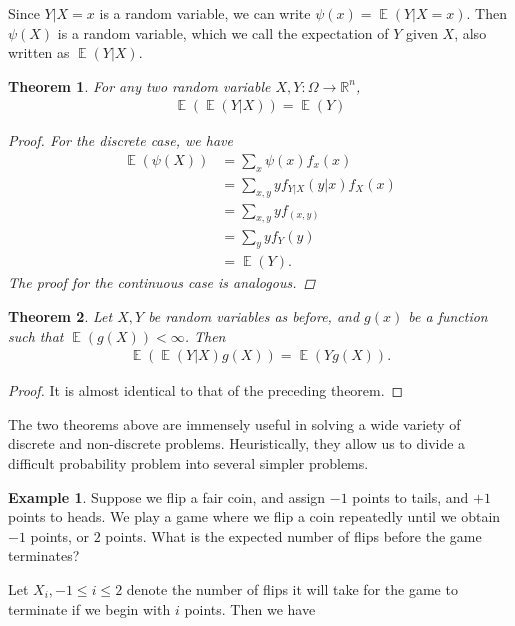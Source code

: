 \documentclass[12pt]{amsbook}
\newcommand{\rr}{\mathbb{R}}
\DeclareMathOperator{\ex}{\mathbb{E}}
\theoremstyle{plain}
\newtheorem{theorem}{Theorem}
\theoremstyle{definition}
\newtheorem*{example}{Example}
\theoremstyle{remark}
\numberwithin{equation}{section}  %
\numberwithin{equation}{section}  %
\begin{document}
	Since $Y|X =x$ is a random variable, we can write $\psi(x) = \ex(Y | X =x)$.
	Then $\psi(X)$ is a random variable, which we call the expectation of $Y$ given
	$X$, also written as $\ex(Y|X)$.
	\begin{theorem}
		For any two random variable $X,Y: \Omega \to \rr^n$,
		\begin{align*}
			\ex(\ex(Y | X)) = \ex(Y)
		\end{align*}
		\begin{proof}
			For the discrete case, we have
			\begin{align*}
				\ex(\psi(X)) 
				& = \sum_{x} \psi(x) f_x(x)
				\\
				& = \sum_{x,y} y f_{Y|X}(y|x) f_X(x)
				\\
				& = \sum_{x,y} y f_{(x,y)}
				\\
				& = \sum_y y f_Y(y)
				\\
				& = \ex(Y).
			\end{align*}
			The proof for the continuous case is analogous. 
		\end{proof}
	\end{theorem}
	\begin{theorem}
		Let $X,Y$ be random variables as before, and $g(x)$ be a function such that
		$\ex(g(X))< \infty$. Then
		\begin{align*}
			\ex(\ex(Y|X)g(X)) = \ex(Yg(X)).
		\end{align*}
	\end{theorem}
	\begin{proof}
		It is almost identical to that of the preceding theorem.
	\end{proof}
	The two theorems above are immensely useful in solving a wide variety of
	discrete and non-discrete problems. Heuristically, they allow us to divide a
	difficult probability problem into several simpler problems.
	\begin{example}
		Suppose we flip a fair coin, and assign $-1$ points to tails, and $+1$ 
		points to
		heads. We play a game where we flip a coin repeatedly until we obtain
		$-1$ points, or $2$ points. What is the expected number of flips before the
		game terminates? 
	\end{example}
	Let $X_i, -1 \le i \le 2$ denote the number of flips it will take for the game
	to terminate if we begin with $i$ points. Then we have
\end{document}

